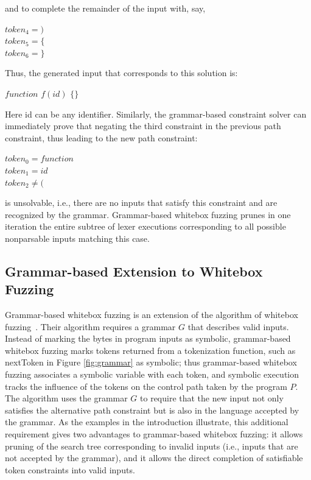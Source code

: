 and to complete the remainder of the input with, say,

\begin{center}

$token_4 = )$ \\
$token_5 = \{$ \\
$token_6 = \}$ \\


\end{center}

Thus, the generated input that corresponds to this solution is:

\begin{center}
$function$  $f(id)$ $\{\}$
\end{center}

Here id can be any identifier. Similarly, the grammar-based constraint solver can immediately prove that negating the third constraint in the previous path constraint, thus leading to the new path constraint:

\begin{center}

$token_0 = function$ \\
$token_1 = id$ \\
$token_2 \neq ($ 


\end{center}
is unsolvable, i.e., there are no inputs that satisfy this constraint and are recognized by the grammar. Grammar-based
whitebox fuzzing prunes in one iteration the entire subtree of lexer executions corresponding to all possible nonparsable
inputs matching this case.

\subsection{Grammar-based Extension to Whitebox Fuzzing}
Grammar-based whitebox fuzzing is an extension of the algorithm of whitebox fuzzing~\cite{fuzzing}. Their algorithm requires a grammar $G$ that describes valid inputs. Instead of marking the bytes in program inputs as symbolic, grammar-based whitebox fuzzing marks tokens returned from a tokenization function, such as nextToken in Figure \ref{fig:grammar} as symbolic; thus grammar-based whitebox fuzzing associates a symbolic variable with each token, and symbolic execution tracks the influence of the tokens on the control path taken by the program $P$. The algorithm uses the grammar $G$ to require that the new input not only satisfies the alternative path constraint but is also in the language accepted by the grammar. As the examples in the introduction illustrate, this additional requirement gives two advantages to grammar-based
whitebox fuzzing: it allows pruning of the search tree corresponding to invalid inputs (i.e., inputs that are not accepted by the grammar), and it allows the direct completion of satisfiable token constraints into valid inputs.

